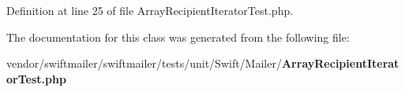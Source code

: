 Definition at line 25 of file Array\+Recipient\+Iterator\+Test.\+php.



The documentation for this class was generated from the following file\+:\begin{DoxyCompactItemize}
\item 
vendor/swiftmailer/swiftmailer/tests/unit/\+Swift/\+Mailer/{\bf Array\+Recipient\+Iterator\+Test.\+php}\end{DoxyCompactItemize}
